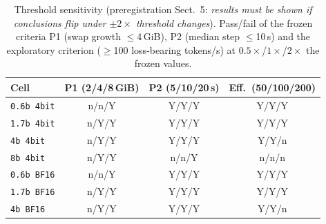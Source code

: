 \begin{table}[t]\centering
\caption{Threshold sensitivity (preregistration Sect.~5: \emph{results must be shown if conclusions flip under $\pm 2\times$ threshold changes}). Pass/fail of the frozen \practical{} criteria P1 (swap growth $\le$4\,GiB), P2 (median step $\le$10\,s) and the exploratory \efficient{} criterion ($\ge$100 loss-bearing tokens/s) at $0.5\times$/$1\times$/$2\times$ the frozen values.}
\label{tab:sens}
\footnotesize\setlength{\tabcolsep}{3pt}
\begin{tabular}{lccc}
\toprule
Cell & P1 (2/4/8\,GiB) & P2 (5/10/20\,s) & Eff.\ (50/100/200)\\
\midrule
\texttt{0.6b 4bit} & n/n/Y & Y/Y/Y & Y/Y/Y\\
\texttt{1.7b 4bit} & n/Y/Y & Y/Y/Y & Y/Y/Y\\
\texttt{4b 4bit} & n/Y/Y & Y/Y/Y & Y/Y/n\\
\texttt{8b 4bit} & n/Y/Y & n/n/Y & n/n/n\\
\texttt{0.6b BF16} & n/n/Y & Y/Y/Y & Y/Y/Y\\
\texttt{1.7b BF16} & n/Y/Y & Y/Y/Y & Y/Y/Y\\
\texttt{4b BF16} & n/Y/Y & Y/Y/Y & Y/Y/n\\
\bottomrule
\end{tabular}
\end{table}
